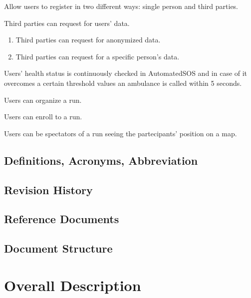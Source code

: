 \documentclass[a4paper]{article}
\begin{document}
\begin{enumerate}[label*={[G.\arabic*]}]
	
	
	\item Allow users to register in two different ways: single person and third parties.
	\item Third parties can request for users' data.
	    
	    \begin{enumerate}[label*=.\arabic*]
	        \item Third parties can request for anonymized data.
	        \item Third parties can request for a specific person's data.
	    \end{enumerate}
	    
	\item Users' health status is continuously checked in AutomatedSOS and in case of it overcomes a certain threshold values an ambulance is called within 5 seconds.
	
	\item Users can organize a run.
	\item Users can enroll to a run.
	\item Users can be spectators of a run seeing the partecipants' position on a map.
	
\end{enumerate}

\subsection{Definitions, Acronyms, Abbreviation}


\subsection{Revision History}

\subsection{Reference Documents}

\subsection{Document Structure}

\section{Overall Description}
\end{document}
